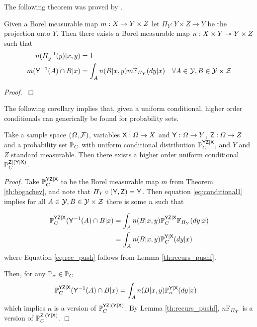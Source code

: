 The following theorem was proved by \citet{bogachev_kantorovich_2020}.

\begin{theorem}\label{th:bogachev}
Given a Borel measurable map $m:X\rightarrowtriangle Y\times Z$ let $\Pi_Y:Y\times Z\to Y$ be the projection onto $Y$. Then there exists a Borel measurable map $n:X\times Y\rightarrowtriangle Y\times Z$ such that 
\begin{align}
    n(\Pi_y^{-1}(y)|x,y) &= 1\label{eq:proper}\\
    m(\mathsf{Y}^{-1}(A)\cap B|x) &= \int_A n(B|x,y) m\mathbb{F}_{\Pi_Y}(dy|x)&\forall A\in \mathcal{Y},B\in\mathcal{Y\times Z}\label{eq:conditional1}
\end{align}
\end{theorem}

\begin{proof}
 \citet[Theorem 3.5]{bogachev_kantorovich_2020}
\end{proof}

The following corollary implies that, given a uniform conditional, higher order conditionals can generically be found for probability sets.

\begin{corollary}\label{th:ho_cond_psets}
Take a sample space $(\Omega,\mathcal{F})$, variables $\mathsf{X}:\Omega\to X$ and $\mathsf{Y}:\Omega\to Y$, $\mathsf{Z}:\Omega\to Z$ and a probability set $\mathbb{P}_C$ with uniform conditional distribution $\mathbb{P}_C^{\mathsf{YZ}|\mathsf{X}}$, and $Y$ and $Z$ standard measurable. Then there exists a higher order uniform conditional $\mathbb{P}_C^{\mathsf{Z}|(\mathsf{Y}|\mathsf{X})}$.
\end{corollary}

\begin{proof}
Take $\mathbb{P}_C^{\mathsf{YZ}|\mathsf{X}}$ to be the Borel measurable map $m$ from Theorem \ref{th:bogachev}, and note that $\Pi_Y\circ (\mathsf{Y},\mathsf{Z})=\mathsf{Y}$. Then equation \eqref{eq:conditional1} implies for all $A\in \mathcal{Y},B\in\mathcal{Y\times Z}$ there is some $n$ such that

\begin{align}
    \mathbb{P}_C^{\mathsf{YZ}|\mathsf{X}}(\mathsf{Y}^{-1}(A)\cap B|x) &= \int_A n(B|x,y) \mathbb{P}_C^{\mathsf{YZ}|\mathsf{X}}\mathbb{F}_{\Pi_Y}(dy|x)\\
    &=\int_A n(B|x,y) \mathbb{P}_C^{\mathsf{Y}|\mathsf{X}}(dy|x)\label{eq:rec_push}
\end{align}
where Equation \eqref{eq:rec_push} follows from Lemma \ref{th:recurs_pushf}.

Then, for any $\mathbb{P}_\alpha\in\mathbb{P}_C$
\begin{align}
    \mathbb{P}_C^{\mathsf{YZ}|\mathsf{X}}(\mathsf{Y}^{-1}(A)\cap B|x) &= \int_A n(B|x,y) \mathbb{P}_{\alpha}^{\mathsf{Y}|\mathsf{X}}(dy|x)
\end{align}
which implies $n$ is a version of $\mathbb{P}_C^{\mathsf{YZ}|(\mathsf{Y}|\mathsf{X})}$. By Lemma \ref{th:recurs_pushf}, $n\mathbb{F}_{\Pi_Y}$ is a version of $\mathbb{P}_C^{\mathsf{Z}|(\mathsf{Y}|\mathsf{X})}$.
\end{proof}

